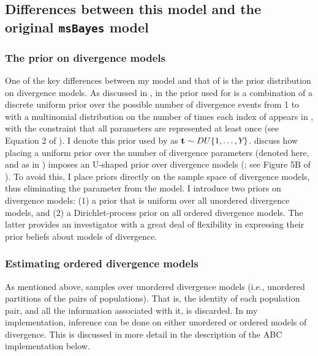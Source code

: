 \subsection{Differences between this model and the original \texttt{msBayes} model}
\subsubsection{The prior on divergence models}
One of the key differences between my model and that of \msb \cite{Huang2011}
is the prior distribution on divergence models.
As discussed in \cite{Oaks2012}, in \msb the prior used for
\divTimeIndexVector is a combination of a discrete uniform prior over the
possible number of divergence events \divTimeNum from 1 to \npairs{} with a
multinomial distribution on the number of times each index of \divTimeVector
appears in \divTimeIndexVector, with the constraint that all \divTime{}
parameters are represented at least once (see Equation 2 of \cite{Oaks2012}).
I denote this prior used by \msb as $\mathbf{t_{}} \sim DU\{1, \ldots, Y_{}\}$.
\cite{Oaks2012} discuss how placing a uniform prior over the number of
divergence parameters (denoted \divTimeNum here, and as \numt{} in
\cite{Huang2011}) imposes an U-shaped prior over divergence
models (\divTimeIndexVector; see
Figure 5B of \cite{Oaks2012}).
To avoid this, I place priors directly on the sample space of divergence
models, thus eliminating the parameter \numt{} from the model.
I introduce two priors on divergence models:
(1) a prior that is uniform over all unordered divergence models, and
(2) a Dirichlet-process prior on all ordered divergence models.
The latter provides an investigator with a great deal of flexibility in
expressing their prior beliefs about models of divergence.

\subsubsection{Estimating ordered divergence models}
As mentioned above, \msb samples over unordered divergence models
(i.e., unordered partitions of the \npairs{} pairs of populations).
That is, the identity of each population pair, and all the information
associated with it, is discarded.
In my implementation, inference can be done on either unordered or ordered
models of divergence.
This is discussed in more detail in the description of the ABC implementation
below.

